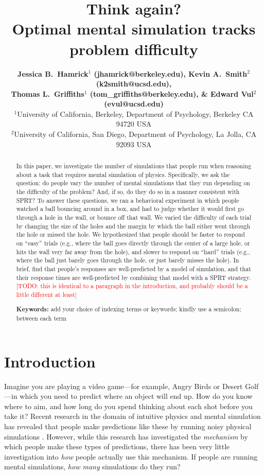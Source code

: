 \documentclass[10pt,letterpaper]{article}
\title{Think again?\\ Optimal mental simulation tracks problem difficulty}
\author{{\large \bf Jessica B.~Hamrick$^1$ (jhamrick@berkeley.edu),
    Kevin A.~Smith$^2$ (k2smith@ucsd.edu),}\\
    {\large \bf Thomas L.~Griffiths$^1$ (tom\_griffiths@berkeley.edu),
      \& Edward Vul$^2$ (evul@ucsd.edu)}\\
    $^1$University of California, Berkeley, Department of Psychology, Berkeley CA 94720 USA\\
    $^2$University of California, San Diego, Department of Psychology, La Jolla, CA 92093 USA}
\newcommand{\TODO}[1]{\textcolor{red}{[TODO: #1]}}
\begin{document}
\maketitle

\begin{abstract}
In this paper, we investigate the number of simulations that people run when reasoning about a task that requires mental simulation of physics. Specifically, we ask the question: do people vary the number of mental simulations that they run depending on the difficulty of the problem? And, if so, do they do so in a manner consistent with SPRT? To answer these questions, we ran a behavioral experiment in which people watched a ball bouncing around in a box, and had to judge whether it would first go through a hole in the wall, or bounce off that wall. We varied the difficulty of each trial by changing the size of the holes and the margin by which the ball either went through the hole or missed the hole. We hypothesized that people should be faster to respond on ``easy'' trials (e.g., where the ball goes directly through the center of a large hole, or hits the wall very far away from the hole), and slower to respond on ``hard'' trials (e.g., where the ball just barely goes through the hole, or just barely misses the hole). In brief, find that people's responses are well-predicted by a model of simulation, and that their response times are well-predicted by combining that model with a SPRT strategy. \TODO{this is identical to a paragraph in the introduction, and probably should be a little different at least}

\textbf{Keywords:} 
add your choice of indexing terms or keywords; kindly use a
semicolon; between each term
\end{abstract}

\section{Introduction}

Imagine you are playing a video game---for example, Angry Birds or Desert Golf---in which you need to predict where an object will end up. How do you know where to aim, and how long do you spend thinking about each shot before you take it? Recent research in the domain of intuitive physics and mental simulation has revealed that people make predictions like these by running noisy physical simulations \cite{Smith:2013fc,Battaglia2013,Smith:2013ug,Smith:2013th,Smith:2014tx,Ullman:2014ut,Hamrick:2015}. However, while this research has investigated the \emph{mechanism} by which people make these types of predictions, there has been very little investigation into \emph{how} people actually use this mechanism. If people are running mental simulations, \emph{how many} simulations do they run?
\end{document}
